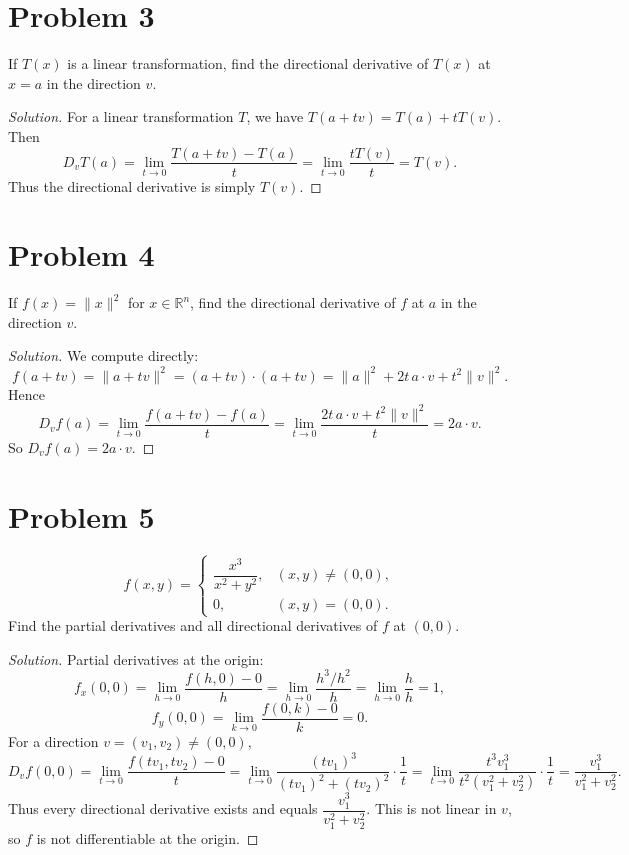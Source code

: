 \documentclass{article}
\begin{document}
\section*{Problem 3}
If \(T(x)\) is a linear transformation, find the directional derivative of \(T(x)\) at \(x=a\) in the direction \(v\).

\begin{proof}[Solution]
	For a linear transformation \(T\), we have \(T(a+tv)=T(a)+tT(v)\). Then
	\[
		D_vT(a)=\lim_{t\to0}\frac{T(a+tv)-T(a)}{t}=\lim_{t\to0}\frac{tT(v)}{t}=T(v).
	\]
	Thus the directional derivative is simply \(T(v)\).
\end{proof}

\section*{Problem 4}
If \(f(x)=\|x\|^2\) for \(x\in\mathbb{R}^n\), find the directional derivative of \(f\) at \(a\) in the direction \(v\).

\begin{proof}[Solution]
	We compute directly:
	\[
		f(a+tv)=\|a+tv\|^2=(a+tv)\cdot(a+tv)=\|a\|^2+2t\,a\cdot v+t^2\|v\|^2.
	\]
	Hence
	\[
		D_vf(a)=\lim_{t\to0}\frac{f(a+tv)-f(a)}{t}=\lim_{t\to0}\frac{2t\,a\cdot v+t^2\|v\|^2}{t}=2a\cdot v.
	\]
	So \(D_vf(a)=2a\cdot v\).
\end{proof}

\section*{Problem 5}
\[
	f(x,y)=\begin{cases}
		\dfrac{x^3}{x^2+y^2}, & (x,y)\neq(0,0), \\[4pt]
		0,                    & (x,y)=(0,0).
	\end{cases}
\]
Find the partial derivatives and all directional derivatives of \(f\) at \((0,0)\).

\begin{proof}[Solution]
	Partial derivatives at the origin:
	\[
		f_x(0,0)=\lim_{h\to0}\frac{f(h,0)-0}{h}=\lim_{h\to0}\frac{h^3/h^2}{h}=\lim_{h\to0}\frac{h}{h}=1,
	\]
	\[
		f_y(0,0)=\lim_{k\to0}\frac{f(0,k)-0}{k}=0.
	\]
	For a direction \(v=(v_1,v_2)\neq(0,0)\),
	\[
		D_vf(0,0)=\lim_{t\to0}\frac{f(tv_1,tv_2)-0}{t}
		=\lim_{t\to0}\frac{(tv_1)^3}{(tv_1)^2+(tv_2)^2}\cdot\frac1t
		=\lim_{t\to0}\frac{t^3v_1^3}{t^2(v_1^2+v_2^2)}\cdot\frac1t
		=\frac{v_1^3}{v_1^2+v_2^2}.
	\]
	Thus every directional derivative exists and equals \(\dfrac{v_1^3}{v_1^2+v_2^2}\). This is not linear in \(v\), so \(f\) is not differentiable at the origin.
\end{proof}
\end{document}
